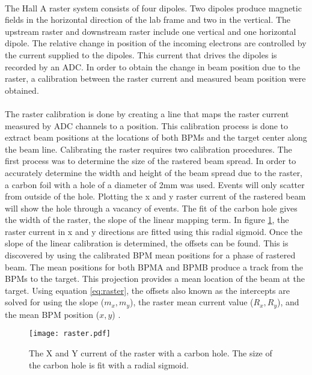 	 
	 \paragraph{} The Hall A raster system consists of four dipoles. Two dipoles produce magnetic fields in the horizontal direction of the lab frame and two in the vertical. The upstream raster and downstream raster include one vertical and one horizontal dipole. The relative change in position of the incoming electrons are controlled by the current supplied to the dipoles. This current that drives the dipoles is recorded by an ADC. In order to obtain the change in beam position due to the raster, a calibration between the raster current and measured beam position were obtained.  

	 \paragraph{}
	 The raster calibration is done by creating a line that maps the raster current measured by ADC channels to a position. This calibration process is done to extract beam positions at the locations of both BPMs and the target center along the beam line. Calibrating the raster requires two calibration procedures. The first process was to determine the size of the rastered beam spread. In order to accurately determine the width and height of the beam spread due to the raster, a carbon foil with a hole of a diameter of 2mm was used. Events will only scatter from outside of the hole. Plotting the x and y raster current of the rastered beam will show the hole through a vacancy of events. The fit of the carbon hole gives the width of the raster, the slope of the linear mapping term. In figure \ref{fig:raster}, the raster current in x and y directions are fitted using this radial sigmoid. Once the slope of the linear calibration is determined, the offsets can be found. This is discovered by using the calibrated BPM mean positions for a phase of rastered beam. The mean positions for both BPMA and BPMB produce a track from the BPMs to the target. This projection provides a mean location of the beam at the target.  Using equation \ref{eq:raster}, the offsets also known as the intercepts are solved for using the slope ($m_x,m_y$), the raster mean current value ($R_x,R_y$), and the mean BPM position ($x,y$) \cite{Trast}.
	 	 
	 \begin{figure}[t]
	 	\centering
	 	\texttt{[image: raster.pdf]} 
	 	\caption{The X and Y current of the raster with a carbon hole. The size of the carbon hole is fit with a radial sigmoid\cite{Trast}.}
	 	\label{fig:raster}
	 \end{figure} 
	 
